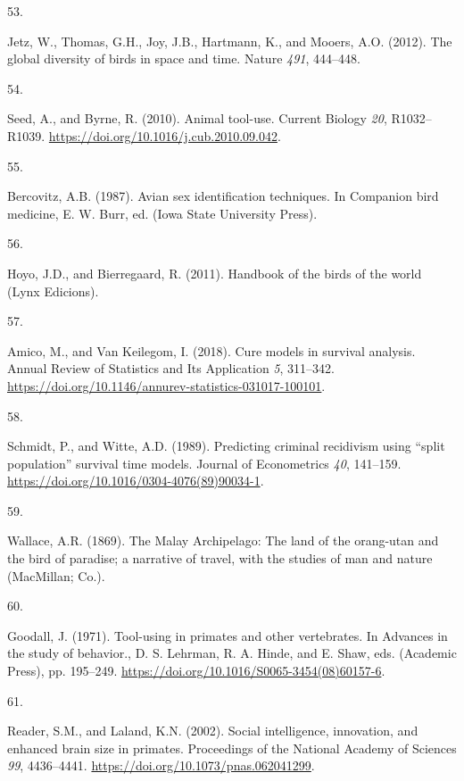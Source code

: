 \documentclass[
  man, donotrepeattitle,floatsintext]{apa6}
\newlength{\cslhangindent}
\newlength{\csllabelwidth}
\newlength{\cslentryspacingunit} %
\newenvironment{CSLReferences}[2] %
 {%
  \setlength{\parindent}{0pt}
  \ifodd #1
  \let\oldpar\par
  \def\par{\hangindent=\cslhangindent\oldpar}
  \fi
  \setlength{\parskip}{#2\cslentryspacingunit}
 }%
 {}
\newcommand{\CSLLeftMargin}[1]{\parbox[t]{\csllabelwidth}{#1}}
\newcommand{\CSLRightInline}[1]{\parbox[t]{\linewidth - \csllabelwidth}{#1}\break}
\begin{document}
\begin{CSLReferences}{0}{0}
\leavevmode{}%
\CSLLeftMargin{53. }%
\CSLRightInline{Jetz, W., Thomas, G.H., Joy, J.B., Hartmann, K., and Mooers, A.O. (2012). The global diversity of birds in space and time. Nature \emph{491}, 444--448.}

\leavevmode{}%
\CSLLeftMargin{54. }%
\CSLRightInline{Seed, A., and Byrne, R. (2010). Animal tool-use. Current Biology \emph{20}, R1032--R1039. \url{https://doi.org/10.1016/j.cub.2010.09.042}.}

\leavevmode{}%
\CSLLeftMargin{55. }%
\CSLRightInline{Bercovitz, A.B. (1987). Avian sex identification techniques. In Companion bird medicine, E. W. Burr, ed. (Iowa State University Press).}

\leavevmode{}%
\CSLLeftMargin{56. }%
\CSLRightInline{Hoyo, J.D., and Bierregaard, R. (2011). Handbook of the birds of the world (Lynx Edicions).}

\leavevmode{}%
\CSLLeftMargin{57. }%
\CSLRightInline{Amico, M., and Van Keilegom, I. (2018). Cure models in survival analysis. Annual Review of Statistics and Its Application \emph{5}, 311--342. \url{https://doi.org/10.1146/annurev-statistics-031017-100101}.}

\leavevmode{}%
\CSLLeftMargin{58. }%
\CSLRightInline{Schmidt, P., and Witte, A.D. (1989). Predicting criminal recidivism using {``split population''} survival time models. Journal of Econometrics \emph{40}, 141--159. \url{https://doi.org/10.1016/0304-4076(89)90034-1}.}

\leavevmode{}%
\CSLLeftMargin{59. }%
\CSLRightInline{Wallace, A.R. (1869). The {M}alay {A}rchipelago: The land of the orang-utan and the bird of paradise; a narrative of travel, with the studies of man and nature (MacMillan; Co.).}

\leavevmode{}%
\CSLLeftMargin{60. }%
\CSLRightInline{Goodall, J. (1971). Tool-using in primates and other vertebrates. In Advances in the study of behavior., D. S. Lehrman, R. A. Hinde, and E. Shaw, eds. (Academic Press), pp. 195--249. \url{https://doi.org/10.1016/S0065-3454(08)60157-6}.}

\leavevmode{}%
\CSLLeftMargin{61. }%
\CSLRightInline{Reader, S.M., and Laland, K.N. (2002). Social intelligence, innovation, and enhanced brain size in primates. Proceedings of the National Academy of Sciences \emph{99}, 4436--4441. \url{https://doi.org/10.1073/pnas.062041299}.}


\end{CSLReferences}
\end{document}
